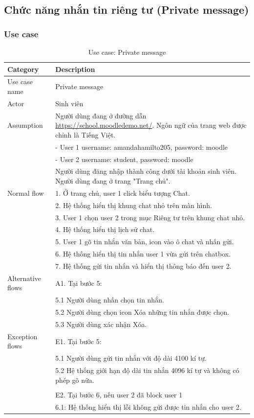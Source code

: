 \subsection{Chức năng nhắn tin riêng tư (Private message)}
\subsubsection{Use case}

\begin{table}[H]
    \centering
    \begin{tabular}{|l|p{11cm}|}
        \hline
        Category & Description \\
        \hline
        Use case name & Private message \\
        \hline
        Actor & Sinh viên \\
        \hline
        Assumption & Người dùng đang ở đường dẫn \url{https://school.moodledemo.net/}. Ngôn ngữ của trang web được chỉnh là Tiếng Việt. \\ 
        & - User 1 username: amandahamilto205, password: moodle\\
        & - User 2 username: student, password: moodle\\
        &Người dùng đăng nhập thành công dưới tài khoản sinh viên. Người dùng đang ở trang "Trang chủ".\\\hline
        Normal flow & 
        1. Ở trang chủ, user 1 click biểu tượng Chat. \\
        & 2. Hệ thống hiển thị khung chat nhỏ trên màn hình. \\
        & 3. User 1 chọn user 2 trong mục Riêng tư trên khung chat nhỏ.\\
        & 4. Hệ thống hiển thị lịch sử chat.\\
        & 5. User 1 gõ tin nhắn văn bản, icon vào ô chat và nhấn gửi.\\
        & 6. Hệ thống hiển thị tin nhắn user 1 vừa gửi trên chatbox.\\
        & 7. Hệ thống gửi tin nhắn và hiển thị thông báo đến user 2.\\\hline
        Alternative flows &
        A1. Tại bước 5:\\
        & 5.1 Người dùng nhấn chọn tin nhắn.\\
        & 5.2 Người dùng chọn icon Xóa những tin nhắn được chọn.\\
        & 5.3 Người dùng xác nhận Xóa.
        \\\hline
        Exception flows &
        E1. Tại bước 5:\\
        & 5.1 Người dùng gửi tin nhắn với độ dài 4100 kí tự.\\
        & 5.2 Hệ thống giới hạn độ dài tin nhắn 4096 kí tự và không có phép gõ nữa.\\ & \\
        & E2. Tại bước 6, nếu user 2 đã block user 1\\
        & 6.1: Hệ thống hiển thị lỗi không gửi được tin nhắn cho user 2.\\\hline
    \end{tabular}
    \caption{Use case: Private message}
    \label{tab:Private-message}
\end{table}

